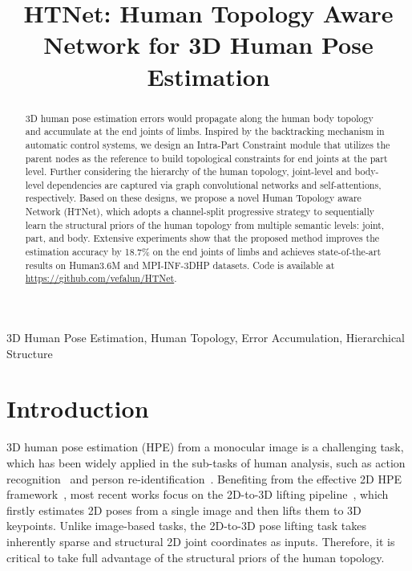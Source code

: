 \documentclass{article}
\title{HTNet: Human Topology Aware Network for 3D Human Pose Estimation}
\def\VspacePb{\vspace{-0.20cm}}
\def\VspacePd{\vspace{-0.10cm}}
\begin{document}
\maketitle

\begin{abstract}
3D human pose estimation errors would propagate along the human body topology and accumulate at the end joints of limbs. Inspired by the backtracking mechanism in automatic control systems, we design an Intra-Part Constraint module that utilizes the parent nodes as the reference to build topological constraints for end joints at the part level.
Further considering the hierarchy of the human topology, joint-level and body-level dependencies are captured via graph convolutional networks and self-attentions, respectively.
Based on these designs, we propose a novel Human Topology aware Network (HTNet), which adopts a channel-split progressive strategy to sequentially learn the structural priors of the human topology from multiple semantic levels: joint, part, and body.
Extensive experiments show that the proposed method improves the estimation accuracy by 18.7\% on the end joints of limbs and achieves state-of-the-art results on Human3.6M and MPI-INF-3DHP datasets. 
Code is available at \href{https://github.com/vefalun/HTNet}{https://github.com/vefalun/HTNet}. 

\end{abstract}
\VspacePd
\begin{keywords}
3D Human Pose Estimation, Human Topology, Error Accumulation, Hierarchical Structure
\end{keywords}
\vspace{-0.2cm}
\section{Introduction}
\VspacePb
\label{sec:intro}

3D human pose estimation (HPE) from a monocular image is a challenging task, which has been widely applied in the sub-tasks of human analysis, such as action recognition~\cite{icassp_action} and person re-identification~\cite{wangtao}. 
Benefiting from the effective 2D HPE framework~\cite{chen2018cascaded}, most recent works focus on the 2D-to-3D lifting pipeline~\cite{simplebaseline}, which firstly estimates 2D poses from a single image and then lifts them to 3D keypoints. 
Unlike image-based tasks, the 2D-to-3D pose lifting task takes inherently sparse and structural 2D joint coordinates as inputs. Therefore, it is critical to take full advantage of the structural priors of the human topology. 
\end{document}
